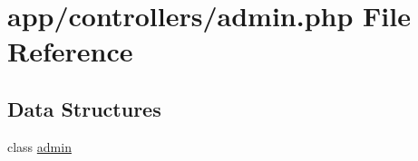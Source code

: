 \hypertarget{controllers_2admin_8php}{}\section{app/controllers/admin.php File Reference}
\label{controllers_2admin_8php}
\subsection*{Data Structures}
\begin{DoxyCompactItemize}
\item 
class \hyperlink{classadmin}{admin}
\end{DoxyCompactItemize}
